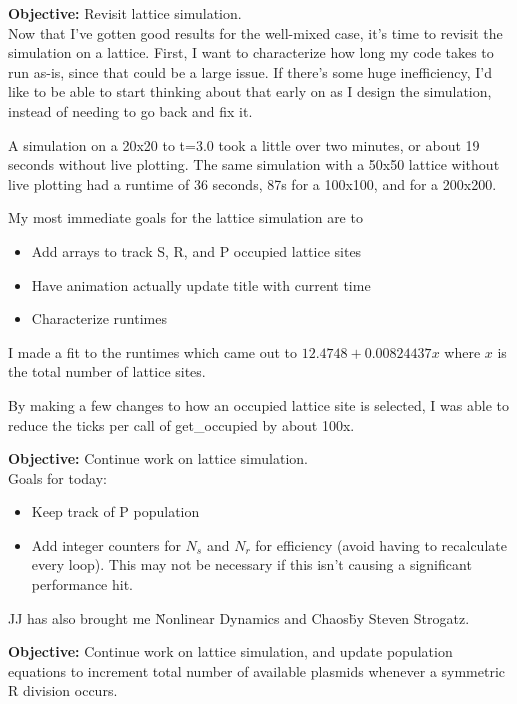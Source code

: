 \documentclass[oneside]{labbook}
\newcommand{\obj}[1]{\textbf{Objective:} #1\\}
\begin{document}
\obj{Revisit lattice simulation.}

Now that I've gotten good results for the well-mixed case, it's time to revisit
the simulation on a lattice. First, I want to characterize how long my code
takes to run as-is, since that could be a large issue. If there's some huge
inefficiency, I'd like to be able to start thinking about that early on as I
design the simulation, instead of needing to go back and fix it.

A simulation on a 20x20 to t=3.0 took a little over two minutes, or about 19 seconds without
live plotting. The same simulation with a 50x50 lattice without live plotting
had a runtime of 36 seconds, 87s for a 100x100, and for a 200x200.

My most immediate goals for the lattice simulation are to
\begin{itemize}
  \item Add arrays to track S, R, and P occupied lattice sites
  \item Have animation actually update title with current time
  \item Characterize runtimes
\end{itemize}

I made a fit to the runtimes which came out to $12.4748 + 0.00824437 x$ where $x$
is the total number of lattice sites.

By making a few changes to how an occupied lattice site is selected, I was able to
reduce the ticks per call of get\_occupied by about 100x.

\obj{Continue work on lattice simulation.}

Goals for today:

\begin{itemize}
  \item Keep track of P population

  \item Add integer counters for $N_s$ and $N_r$ for efficiency (avoid having to recalculate every loop).
  This may not be necessary if this isn't causing a significant performance hit.
\end{itemize}

JJ has also brought me \"Nonlinear Dynamics and Chaos\" by Steven Strogatz.


\obj{Continue work on lattice simulation, and update population equations to increment
total number of available plasmids whenever a symmetric R division occurs.}
\end{document}
